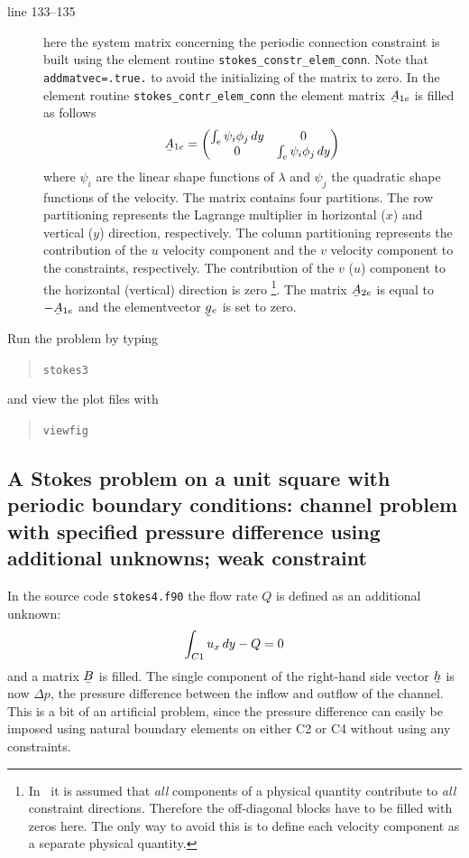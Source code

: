 \begin{description}
   \item[line 133--135] here the system matrix concerning the periodic
     connection constraint is built using the element routine
     \texttt{stokes\_constr\_elem\_conn}. Note that \texttt{addmatvec=.true.} to
     avoid the initializing of the matrix to zero. In the element routine
     \texttt{stokes\_contr\_elem\_conn} the element
      matrix $\mat A_{1e}$ is filled as follows
\[
   \mat A_{1e}=
   \begin{pmatrix}
       \int_{e}\psi_i\phi_j\D y & 0 \\
       0 & \int_{e}\psi_i\phi_j\D y 
   \end{pmatrix}
\]
     where $\psi_i$ are the linear shape functions
     of $\lambda$ and $\psi_j$ the quadratic shape functions of the velocity.
The matrix contains four partitions.
The row partitioning represents the
Lagrange multiplier in horizontal ($x$) and vertical ($y$) direction,
respectively. The
column partitioning represents the contribution of the $u$ velocity component
and the $v$ velocity component to the constraints, respectively.
The contribution of the $v$ ($u$) component to the horizontal (vertical)
direction is zero \footnote{In \tfem\ it is assumed that \emph{all}
 components of 
a physical quantity contribute to \emph{all}
constraint directions. Therefore the off-diagonal
blocks have to be filled with zeros here. The only way to avoid this is to
define each velocity component as a separate physical quantity.}.
The matrix $\mat A_{2e}$ is equal to $-\mat A_{1e}$ and
     the elementvector $\col g_e$ is set to zero.
\end{description}
Run the problem by typing
\begin{quote}
   \texttt{stokes3}
\end{quote}
and view the plot files with
\begin{quote}
  \texttt{viewfig}
\end{quote}

\subsection{A Stokes problem on a unit square with periodic boundary
         conditions: channel problem with specified pressure difference using
         additional unknowns; weak constraint}
                                                                                
In the source code \texttt{stokes4.f90} the flow rate $Q$ is defined as an
additional unknown:
\[
     \int_{C1}u_x\,d y - Q = 0
\]
and a matrix $\mat B$ is filled. The single component of the
right-hand side vector $\col h$
is now $\Delta p$, the pressure difference between the inflow
and outflow of the channel. This is a bit of an artificial problem, since the
pressure difference can easily be imposed using natural boundary elements on
either C2 or C4 without using any constraints.

